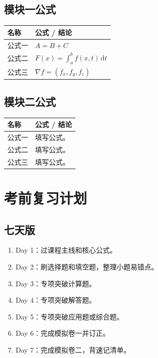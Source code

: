 \documentclass[UTF8,zihao=-4]{ctexart}
\newcommand{\dd}{\,\mathrm d}
\newcommand{\grad}{\nabla}
\begin{document}
\subsection{模块一公式}

\begin{longtable}{p{}p{}}
\toprule
\textbf{名称} & \textbf{公式 / 结论} \\
\midrule
公式一 & $A=B+C$ \\
公式二 & $F(x)=\int_a^b f(x,t)\dd t$ \\
公式三 & $\grad f=(f_x,f_y,f_z)$ \\
\bottomrule
\end{longtable}

\subsection{模块二公式}

\begin{longtable}{p{}p{}}
\toprule
\textbf{名称} & \textbf{公式 / 结论} \\
\midrule
公式一 & 填写公式。 \\
公式二 & 填写公式。 \\
公式三 & 填写公式。 \\
\bottomrule
\end{longtable}

\section{考前复习计划}

\subsection{七天版}
\begin{methodbox}[7 天复习安排]
\begin{enumerate}
  \item Day 1：过课程主线和核心公式。
  \item Day 2：刷选择题和填空题，整理小题易错点。
  \item Day 3：专项突破计算题。
  \item Day 4：专项突破解答题。
  \item Day 5：专项突破应用题或综合题。
  \item Day 6：完成模拟卷一并订正。
  \item Day 7：完成模拟卷二，背速记清单。
\end{enumerate}
\end{methodbox}
\end{document}
